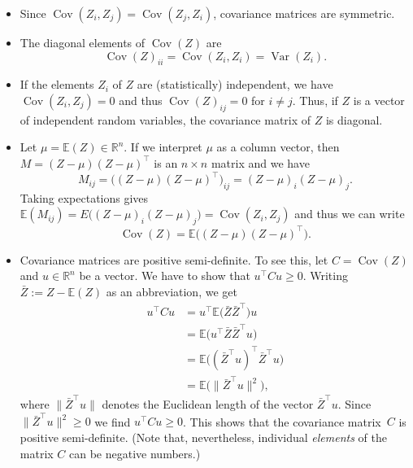 \documentclass[
  a4paper,
]{article}
\theoremstyle{definition}
\theoremstyle{definition}
\theoremstyle{definition}
\theoremstyle{definition}
\theoremstyle{remark}
\begin{document}
\begin{itemize}
\item
  Since \(\mathop{\mathrm{Cov}}(Z_i, Z_j) = \mathop{\mathrm{Cov}}(Z_j, Z_i)\), covariance matrices are
  symmetric.
\item
  The diagonal elements of \(\mathop{\mathrm{Cov}}(Z)\) are
  \begin{equation}
    \mathop{\mathrm{Cov}}(Z)_{ii}
    = \mathop{\mathrm{Cov}}(Z_i, Z_i)
    = \mathop{\mathrm{Var}}(Z_i).  \label{eq:Cov-diag-elem}
  \end{equation}
\item
  If the elements \(Z_i\) of \(Z\) are (statistically) independent,
  we have \(\mathop{\mathrm{Cov}}(Z_i, Z_j) = 0\) and thus \(\mathop{\mathrm{Cov}}(Z)_{ij} = 0\)
  for \(i \neq j\). Thus, if \(Z\) is a vector of independent random variables,
  the covariance matrix of \(Z\) is diagonal.
\item
  Let \(\mu = \mathbb{E}(Z) \in \mathbb{R}^n\). If we interpret \(\mu\) as a column vector,
  then \(M = (Z - \mu) (Z - \mu)^\top\) is an \(n\times n\) matrix and we have
  \begin{equation*}
    M_{ij}
    = \bigl( (Z - \mu) (Z - \mu)^\top \bigr)_{ij}
    = (Z - \mu)_i (Z - \mu)_j.
  \end{equation*}
  Taking expectations gives \(\mathbb{E}(M_{ij}) = E\bigl( (Z - \mu)_i (Z - \mu)_j \bigr) = \mathop{\mathrm{Cov}}(Z_i, Z_j)\) and thus we can write
  \begin{equation}
    \mathop{\mathrm{Cov}}(Z)
    = \mathbb{E}\bigl( (Z - \mu) (Z - \mu)^\top \bigr).  \label{eq:cov-prod}
  \end{equation}
\item
  Covariance matrices are positive semi-definite. To see this, let
  \(C = \mathop{\mathrm{Cov}}(Z)\) and \(u \in\mathbb{R}^n\) be a vector. We have to show that
  \(u^\top C u \geq 0\). Writing \(\bar Z := Z - \mathbb{E}(Z)\) as an abbreviation,
  we get
  \begin{align*}
    u^\top C u
    &= u^\top \mathbb{E}\bigl( \bar Z \bar Z^\top \bigr) u \\
    &= \mathbb{E}\bigl( u^\top \bar Z \bar Z^\top u \bigr) \\
    &= \mathbb{E}\bigl( (\bar Z^\top u)^\top \bar Z^\top u \bigr) \\
    &= \mathbb{E}\bigl( \|\bar Z^\top u\|^2 \bigr),
  \end{align*}
  where \(\|\bar Z^\top u\|\) denotes the Euclidean length of the
  vector \(\bar Z^\top u\). Since \(\|\bar Z^\top u\|^2 \geq 0\)
  we find \(u^\top C u \geq 0\). This shows that the covariance matrix~\(C\)
  is positive semi-definite. (Note that, nevertheless,
  individual \emph{elements} of the matrix \(C\) can be negative numbers.)
\end{itemize}
\end{document}
